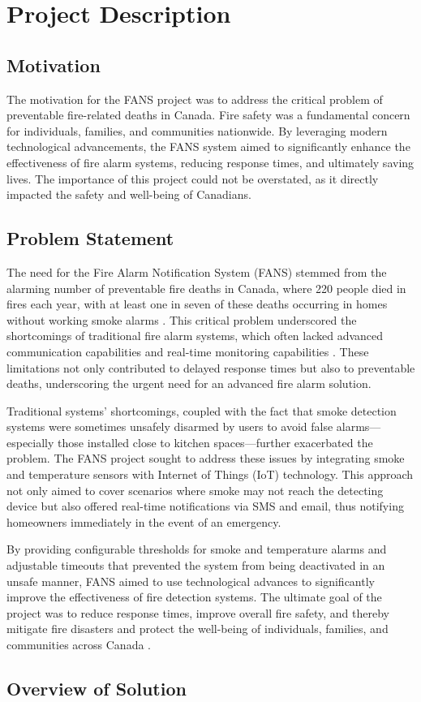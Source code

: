 \section{Project Description}

\subsection{Motivation}

The motivation for the FANS project was to address the critical problem of preventable fire-related deaths in Canada.
Fire safety was a fundamental concern for individuals, families, and communities nationwide. By leveraging modern
technological advancements, the FANS system aimed to significantly enhance the effectiveness of fire alarm systems,
reducing response times, and ultimately saving lives. The importance of this project could not be overstated, as it
directly impacted the safety and well-being of Canadians.

\subsection{Problem Statement}

The need for the Fire Alarm Notification System (FANS) stemmed from the alarming number of preventable fire deaths in
Canada, where 220 people died in fires each year, with at least one in seven of these deaths occurring in homes without
working smoke alarms \cite{fire-stats}. This critical problem underscored the shortcomings of traditional fire alarm
systems, which often lacked advanced communication capabilities and real-time monitoring capabilities
\cite{modern-fire-alarms}. These limitations not only contributed to delayed response times but also to preventable
deaths, underscoring the urgent need for an advanced fire alarm solution.

Traditional systems’ shortcomings, coupled with the fact that smoke detection systems were sometimes unsafely disarmed
by users to avoid false alarms—especially those installed close to kitchen spaces—further exacerbated the problem. The
FANS project sought to address these issues by integrating smoke and temperature sensors with Internet of Things (IoT)
technology. This approach not only aimed to cover scenarios where smoke may not reach the detecting device but also
offered real-time notifications via SMS and email, thus notifying homeowners immediately in the event of an emergency.

By providing configurable thresholds for smoke and temperature alarms and adjustable timeouts that prevented the system
from being deactivated in an unsafe manner, FANS aimed to use technological advances to significantly improve the
effectiveness of fire detection systems. The ultimate goal of the project was to reduce response times, improve overall
fire safety, and thereby mitigate fire disasters and protect the well-being of individuals, families, and communities
across Canada \cite{smoke-alarm-gc}.

\subsection{Overview of Solution}
